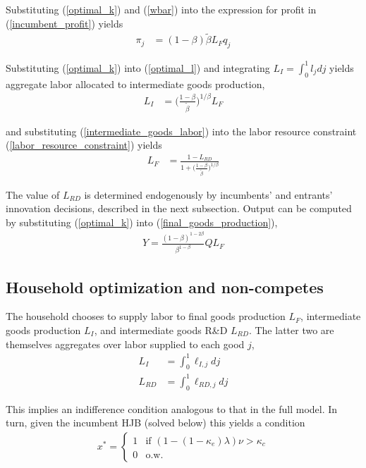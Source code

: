 \documentclass[12pt,english]{article}
\theoremstyle{remark}
\begin{document}
Substituting (\ref{optimal_k}) and (\ref{wbar}) into the expression for profit in (\ref{incumbent_profit}) yields
\begin{align}
\pi_j &= (1-\beta) \tilde{\beta} L_F q_j \label{profits_eq}
\end{align}

Substituting (\ref{optimal_k}) into (\ref{optimal_l}) and integrating $L_I = \int_0^1 l_j dj$ yields aggregate labor allocated to intermediate goods production,
\begin{align}
L_I &= \Big( \frac{1-\beta}{\tilde{\beta}} \Big)^{1 / \beta} L_F \label{intermediate_goods_labor}
\end{align}

and substituting (\ref{intermediate_goods_labor}) into the labor resource constraint (\ref{labor_resource_constraint}) yields
\begin{align}
L_F &= \frac{1 - L_{RD}}{1 + \Big(\frac{1-\beta}{\tilde{\beta}}\Big)^{1/\beta}}
\end{align}

The value of $L_{RD}$ is determined endogenously by incumbents' and entrants' innovation decisions, described in the next subsection. Output can be computed by substituting (\ref{optimal_k}) into (\ref{final_goods_production}), 
\begin{align}
Y = \frac{(1-\beta)^{1-2\beta}}{\beta^{1-\beta}} Q L_F \label{flow_output}
\end{align}

\subsection{Household optimization and non-competes}

The household chooses to supply labor to final goods production $L_F$, intermediate goods production $L_I$, and intermediate goods R\&D $L_{RD}$. The latter two are themselves aggregates over labor supplied to each good $j$,
\begin{align}
	L_I &= \int_0^1 \ell_{I,j} dj \\
	L_{RD} &= \int_0^1 \ell_{RD,j} dj
\end{align}



This implies an indifference condition analogous to that in the full model. In turn, given the incumbent HJB (solved below) this yields a condition
\begin{align}
	x^* = \begin{cases}
		1 & \textrm{if } (1-(1-\kappa_{e})\lambda)\nu > \kappa_{c}\\
		0 & \textrm{o.w.}
	\end{cases} \label{eq_nca_policy}
\end{align}
\end{document}
